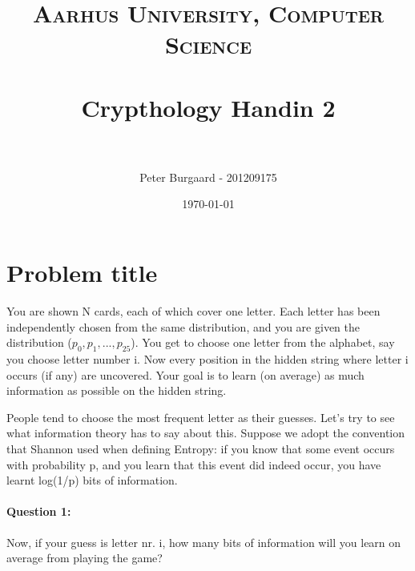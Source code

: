 \documentclass[paper=a4, fontsize=11pt]{scrartcl} %
\title{	
	\normalfont \normalsize 
	\textsc{Aarhus University, Computer Science} \\ [25pt] %
	\horrule{0.5pt} \\[0.4cm] %
	\huge Crypthology Handin 2\\ %
	\horrule{2pt} \\[0.5cm] %
}
\author{Peter Burgaard - 201209175} %
\date{\normalsize\today} %
\numberwithin{equation}{section} %
\numberwithin{figure}{section} %
\numberwithin{table}{section} %
\begin{document}
	
	\maketitle %
	
	\section{Problem title}

	You are shown N cards, each of which cover one letter. Each letter has been independently chosen from the same distribution, and you are given the distribution ($p_0, p_1,..., p_{25}$). You get to choose one letter from the alphabet, say you choose letter number i. Now every position in the hidden string where letter i occurs (if any) are uncovered. Your goal is to learn (on average) as much information as possible on the hidden string.
	
	People tend to choose the most frequent letter as their guesses. Let's try to see what information theory has to say about this. Suppose we adopt the convention that Shannon used when defining Entropy: if you know that some event occurs with probability p, and you learn that this event did indeed occur, you have learnt log(1/p) bits of information.
	
	\paragraph{Question 1: }Now, if your guess is letter nr. i, how many bits of information will you learn on average from playing the game?  \\%
	
\end{document}
